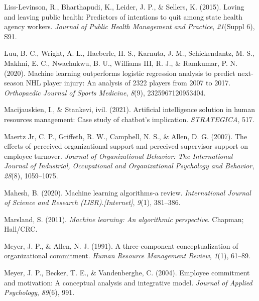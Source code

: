 \documentclass[
  man]{apa7}
\newlength{\cslhangindent}
\newlength{\cslentryspacingunit} %
\newenvironment{CSLReferences}[2] %
 {%
  \setlength{\parindent}{0pt}
  \ifodd #1
  \let\oldpar\par
  \def\par{\hangindent=\cslhangindent\oldpar}
  \fi
  \setlength{\parskip}{#2\cslentryspacingunit}
 }%
 {}
\begin{document}
\begin{CSLReferences}{1}{0}
\leavevmode{}%
Liss-Levinson, R., Bharthapudi, K., Leider, J. P., \& Sellers, K. (2015). Loving and leaving public health: Predictors of intentions to quit among state health agency workers. \emph{Journal of Public Health Management and Practice}, \emph{21}(Suppl 6), S91.

\leavevmode{}%
Luu, B. C., Wright, A. L., Haeberle, H. S., Karnuta, J. M., Schickendantz, M. S., Makhni, E. C., Nwachukwu, B. U., Williams III, R. J., \& Ramkumar, P. N. (2020). Machine learning outperforms logistic regression analysis to predict next-season NHL player injury: An analysis of 2322 players from 2007 to 2017. \emph{Orthopaedic Journal of Sports Medicine}, \emph{8}(9), 2325967120953404.

\leavevmode{}%
Macijauskien, I., \& Stankevi, ivil. (2021). Artificial intelligence solution in human resources management: Case study of chatbot's implication. \emph{STRATEGICA}, 517.

\leavevmode{}%
Maertz Jr, C. P., Griffeth, R. W., Campbell, N. S., \& Allen, D. G. (2007). The effects of perceived organizational support and perceived supervisor support on employee turnover. \emph{Journal of Organizational Behavior: The International Journal of Industrial, Occupational and Organizational Psychology and Behavior}, \emph{28}(8), 1059--1075.

\leavevmode{}%
Mahesh, B. (2020). Machine learning algorithms-a review. \emph{International Journal of Science and Research (IJSR).{[}Internet{]}}, \emph{9}(1), 381--386.

\leavevmode{}%
Marsland, S. (2011). \emph{Machine learning: An algorithmic perspective}. Chapman; Hall/CRC.

\leavevmode{}%
Meyer, J. P., \& Allen, N. J. (1991). A three-component conceptualization of organizational commitment. \emph{Human Resource Management Review}, \emph{1}(1), 61--89.

\leavevmode{}%
Meyer, J. P., Becker, T. E., \& Vandenberghe, C. (2004). Employee commitment and motivation: A conceptual analysis and integrative model. \emph{Journal of Applied Psychology}, \emph{89}(6), 991.


\end{CSLReferences}
\end{document}
